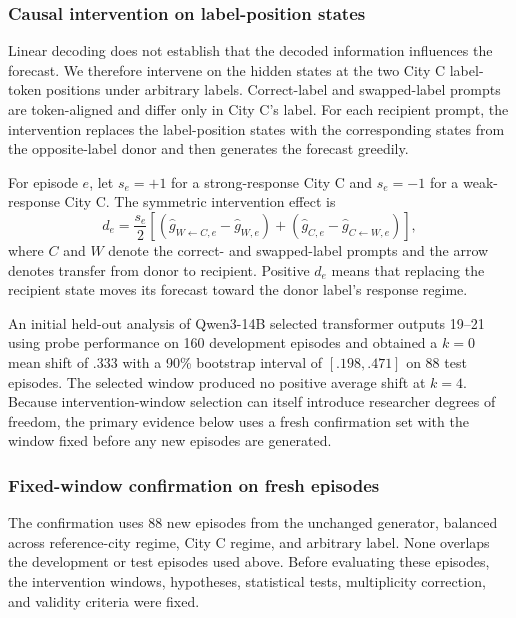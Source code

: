 \subsubsection{Causal intervention on label-position states}
\label{app:coin-city-causal-patch}

Linear decoding does not establish that the decoded information influences the forecast.
We therefore intervene on the hidden states at the two City C label-token positions under arbitrary labels.
Correct-label and swapped-label prompts are token-aligned and differ only in City C's label.
For each recipient prompt, the intervention replaces the label-position states with the corresponding states from the opposite-label donor and then generates the forecast greedily.

For episode \(e\), let \(s_e=+1\) for a strong-response City C and \(s_e=-1\) for a weak-response City C.
The symmetric intervention effect is
\[
d_e
=
\frac{s_e}{2}
\left[
\left(
\widehat g_{W\leftarrow C,e}
-
\widehat g_{W,e}
\right)
+
\left(
\widehat g_{C,e}
-
\widehat g_{C\leftarrow W,e}
\right)
\right],
\]
where \(C\) and \(W\) denote the correct- and swapped-label prompts and the arrow denotes transfer from donor to recipient.
Positive \(d_e\) means that replacing the recipient state moves its forecast toward the donor label's response regime.

An initial held-out analysis of Qwen3-14B selected transformer outputs 19--21 using probe performance on 160 development episodes and obtained a \(k=0\) mean shift of $.333$ with a 90\% bootstrap interval of \([.198,.471]\) on 88 test episodes.
The selected window produced no positive average shift at \(k=4\).
Because intervention-window selection can itself introduce researcher degrees of freedom, the primary evidence below uses a fresh confirmation set with the window fixed before any new episodes are generated.

\subsubsection{Fixed-window confirmation on fresh episodes}
\label{app:coin-city-fixed-window}

The confirmation uses 88 new episodes from the unchanged generator, balanced across reference-city regime, City C regime, and arbitrary label.
None overlaps the development or test episodes used above.
Before evaluating these episodes, the intervention windows, hypotheses, statistical tests, multiplicity correction, and validity criteria were fixed.

